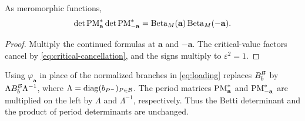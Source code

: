 \begin{corollary}\label{cor:opposite-periods}
As meromorphic functions,
\[
 \det\mathrm{PM}^*_{\mathbf a}\det\mathrm{PM}^*_{-\mathbf a}
 =\operatorname{Beta}_M(\mathbf a)\operatorname{Beta}_M(-\mathbf a).
\]
\end{corollary}
\begin{proof}
Multiply the continued formulas at $\mathbf a$ and $-\mathbf a$.
The critical-value factors cancel by \eqref{eq:critical-cancellation},
and the signs multiply to $\varepsilon^2=1$.
\end{proof}

\begin{remark}
Using $\varphi_{\mathbf a}$ in place of the normalized branches in
\eqref{eq:loading} replaces $B_b^{\mathcal B}$ by
$\Lambda B_b^{\mathcal B}\Lambda^{-1}$, where
$\Lambda=\operatorname{diag}(b_{P^-})_{P\in\mathcal B}$.
The period matrices $\mathrm{PM}^*_{\mathbf a}$ and $\mathrm{PM}^*_{-\mathbf a}$
are multiplied on the left by $\Lambda$ and $\Lambda^{-1}$,
respectively. Thus the Betti determinant and the product of period
determinants are unchanged.
\end{remark}
